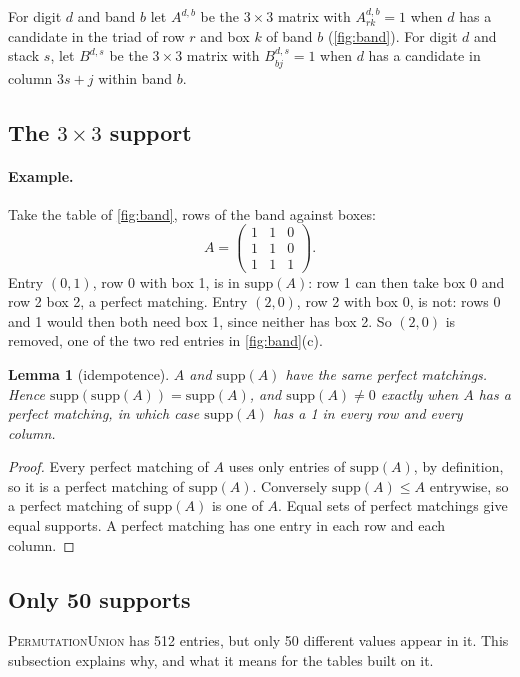 \documentclass[11pt]{article}
\newtheorem{lemma}[theorem]{Lemma}
\theoremstyle{definition}
\theoremstyle{plain}
\let\origtextsc\textsc
\renewcommand{\textsc}[1]{\textup{\origtextsc{#1}}}
\begin{document}
For digit $d$ and band $b$ let $A^{d,b}$ be the $3\times 3$ matrix with $A^{d,b}_{rk}=1$ when $d$ has a candidate in
the triad of row $r$ and box $k$ of band $b$ (\cref{fig:band}). For digit $d$ and stack $s$, let $B^{d,s}$ be the
$3\times 3$ matrix with $B^{d,s}_{bj}=1$ when $d$ has a candidate in column $3s+j$ within band $b$.

\subsection{The $3\times 3$ support}

\paragraph{Example.} Take the table of \cref{fig:band}, rows of the band against boxes:
\[
A=\begin{pmatrix} 1 & 1 & 0 \\ 1 & 1 & 0 \\ 1 & 1 & 1 \end{pmatrix}.
\]
Entry $(0,1)$, row 0 with box 1, is in $\mathrm{supp}(A)$: row 1 can then take box 0 and row 2 box 2, a perfect
matching. Entry $(2,0)$, row 2 with box 0, is not: rows 0 and 1 would then both need box 1, since neither has box 2.
So $(2,0)$ is removed, one of the two red entries in \cref{fig:band}(c).

\begin{lemma}[idempotence]
\label{lem:idempotent}
$A$ and $\mathrm{supp}(A)$ have the same perfect matchings. Hence $\mathrm{supp}(\mathrm{supp}(A))=\mathrm{supp}(A)$, and
$\mathrm{supp}(A)\neq 0$ exactly when $A$ has a perfect matching, in which case $\mathrm{supp}(A)$ has a 1 in every row
and every column.
\end{lemma}
\begin{proof}
Every perfect matching of $A$ uses only entries of $\mathrm{supp}(A)$, by definition, so it is a perfect matching of
$\mathrm{supp}(A)$. Conversely $\mathrm{supp}(A)\le A$ entrywise, so a perfect matching of $\mathrm{supp}(A)$ is one of $A$.
Equal sets of perfect matchings give equal supports. A perfect matching has one entry in each row and each column.
\end{proof}

\subsection{Only 50 supports}
\label{sec:fifty}

\textsc{PermutationUnion} has 512 entries, but only 50 different values appear in it. This subsection explains why,
and what it means for the tables built on it.
\end{document}
